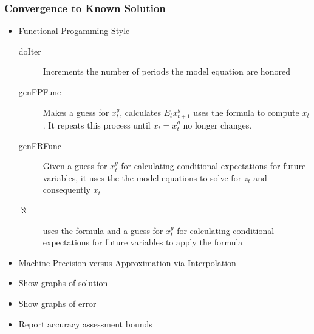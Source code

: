 \documentclass[letter]{beamer}
\begin{document}
\begin{frame}
  \frametitle{Convergence to Known Solution }
  \begin{itemize}
  \item Functional Progamming Style
    \begin{description}
\item[doIter] Increments the number of periods the model equation are honored
\item[genFPFunc] Makes a guess for $x^g_t$, calculates $E_t x^g_{t+1}$ uses the 
formula  to compute $x_t$.  It repeats this process until 
$x_t=x^g_t$ no longer changes.
\item[genFRFunc] Given a guess for $x^g_t$ for calculating conditional expectations for future variables, it uses the the model equations  to solve for $z_t$
and consequently $x_t$
\item[ $\aleph$] uses the formula and a guess for $x^g_t$ for calculating conditional expectations for future variables to apply the formula 
    \end{description}
 \item  Machine Precision versus Approximation via  Interpolation
  \item Show graphs of solution
  \item Show graphs of error
  \item Report accuracy assessment bounds
  \end{itemize}
\end{frame}
\end{document}
